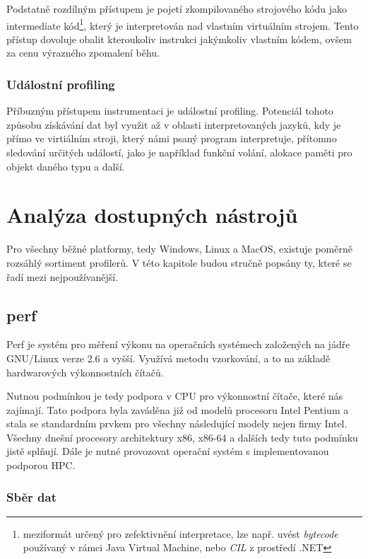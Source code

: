 \documentclass[czech,BP]{thesiskiv}
\begin{document}
Podstatně rozdílným přístupem je pojetí zkompilovaného strojového kódu jako intermediate kód\footnote{meziformát určený pro zefektivnění interpretace, lze např. uvést \emph{bytecode} používaný v rámci Java Virtual Machine, nebo \emph{CIL} z prostředí .NET}, který je interpretován nad vlastním virtuálním strojem\cite{grind2}. Tento přístup dovoluje obalit kteroukoliv instrukci jakýmkoliv vlastním kódem, ovšem za cenu výrazného zpomalení běhu.

\subsection{Událostní profiling}

Příbuzným přístupem instrumentaci je událostní profiling. Potenciál tohoto způsobu získávání dat byl využit až v oblasti interpretovaných jazyků, kdy je přímo ve virtiálním stroji, který námi psaný program interpretuje, přítomno sledování určitých událostí, jako je například funkční volání, alokace paměti pro objekt daného typu a další.


\newpage

\chapter{Analýza dostupných nástrojů}

Pro všechny běžné platformy, tedy Windows, Linux a MacOS, existuje poměrně rozsáhlý sortiment profilerů. V této kapitole budou stručně popsány ty, které se řadí mezi nejpoužívanější.

\section{perf}\label{subsec:perf}

Perf je systém pro měření výkonu na operačních systémech založených na jádře GNU/Linux verze 2.6 a vyšší. Využívá metodu vzorkování, a to na základě hardwarových výkonnostních čítačů.

Nutnou podmínkou je tedy podpora v CPU pro výkonnostní čítače, které nás zajímají. Tato podpora byla zaváděna již od modelů procesoru Intel Pentium\cite{perf3} a stala se standardním prvkem pro všechny následující modely nejen firmy Intel. Všechny dnešní procesory architektury x86, x86-64 a dalších tedy tuto podmínku jistě splňují. Dále je nutné provozovat operační systém s implementovanou podporou HPC.

\subsection*{Sběr dat}\label{subsubsec:perf-collect}
\end{document}
